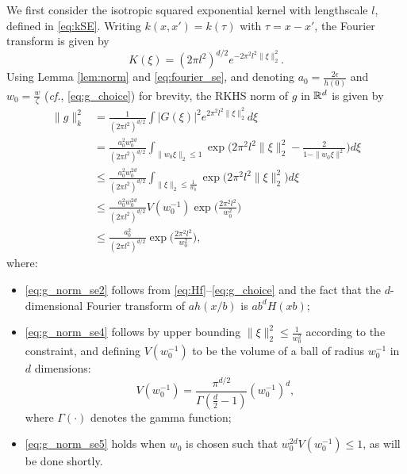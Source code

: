 \documentclass[english,onecolumn,final,11pt]{IEEEtran} %
\begin{document}
We first consider the isotropic squared exponential kernel with lengthscale $l$, defined in \eqref{eq:kSE}.  Writing $k(x,x') = k(\tau)$ with $\tau = x - x'$, the Fourier transform is given by \cite[Sec.~4.2]{Ras06}
\begin{equation}
    K(\xi) = (2\pi l^2)^{d/2} e^{- 2\pi^2l^2 \|\xi\|_2^2}. \label{eq:fourier_se}
\end{equation}
Using Lemma \ref{lem:norm} and \eqref{eq:fourier_se}, and denoting $a_0 = \frac{2\epsilon}{h(0)}$ and $w_0 = \frac{w}{\zeta}$ (\emph{cf.}, \eqref{eq:g_choice}) for brevity, the RKHS norm of $g$ in $\mathbb{R}^d$ is given by
\begin{align}
    \|g\|_k^2
        &= \frac{1}{(2\pi l^2)^{d/2}} \int |G(\xi)|^2 e^{ 2\pi^2 l^2 \|\xi\|_2^2 } d\xi \label{eq:g_norm_se} \\
        &=  \frac{a_0^2 w_0^{2d} }{(2\pi l^2)^{d/2}} \int_{ \|w_0 \xi\|_2 \le 1} \exp\bigg( 2\pi^2 l^2  \|\xi\|_2^2 - \frac{2}{ 1-\| w_0 \xi\|^2 } \bigg) d\xi \label{eq:g_norm_se2} \\
        &\le \frac{a_0^2 w_0^{2d}}{(2\pi l^2)^{d/2}} \int_{\|\xi\|_2 \le \frac{1}{w_0}} \exp\big( 2\pi^2 l^2  \|\xi\|_2^2 \big) d\xi \\
        &\le \frac{a_0^2 w_0^{2d}}{(2\pi l^2)^{d/2}} V(w_0^{-1}) \exp\Big( \frac{ 2\pi^2 l^2  }{ w_0^2 } \Big) \label{eq:g_norm_se4} \\
        &\le  \frac{a_0^2}{(2\pi l^2)^{d/2}} \exp\Big( \frac{ 2\pi^2 l^2 }{ w_0^2 } \Big), \label{eq:g_norm_se5}
\end{align}
where:
\begin{itemize}
    \item \eqref{eq:g_norm_se2} follows from \eqref{eq:Hf}--\eqref{eq:g_choice} and the fact that the $d$-dimensional Fourier transform of $a h(x/b)$ is $ab^d H(xb)$;
    \item \eqref{eq:g_norm_se4} follows by upper bounding $\|\xi\|_2^2 \le \frac{1}{w_0^2}$ according to the constraint, and defining $V(w_0^{-1})$ to be the volume of a ball of radius $w_0^{-1}$ in $d$ dimensions:
    \begin{equation}
        V(w_0^{-1}) = \frac{\pi^{d/2}}{\Gamma(\frac{d}{2}-1)} (w_0^{-1})^d, \label{eq:volume}
    \end{equation}
    where $\Gamma(\cdot)$ denotes the gamma function;
    \item \eqref{eq:g_norm_se5} holds when $w_0$ is chosen such that $w_0^{2d} V(w_0^{-1}) \le 1$, as will be done shortly.
\end{itemize}  
\end{document}
